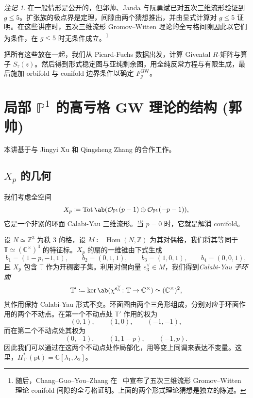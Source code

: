 \documentclass{amsart}
\theoremstyle{definition}
\theoremstyle{remark}
\newtheorem{rmk}[thm]{注记}
\theoremstyle{plain}
\theoremstyle{definition}
\theoremstyle{remark}
\newcommand{\C}{\mathbb{C}}
\newcommand{\Z}{\mathbb{Z}}
\renewcommand{\P}{\mathbb{P}}
\newcommand{\mc}[1]{\mathcal{#1}}
\newcommand{\T}{\mathbb{T}}
\newcommand{\mr}[1]{\mathrm{#1}}
\newcommand{\on}[1]{\operatorname{#1}}
\newcommand{\1}{\mathbf{1}}
\newcommand{\2}{\mathbf{2}}
\newcommand{\3}{\mathbf{3}}
\DeclareMathOperator{\Hom}{Hom}
\begin{document}
\begin{rmk}
     在一般情形是公开的，但郭帅、Janda 与阮勇斌已对五次三维流形验证到 \(g \leq 5\)。扩张族的极点界是定理，间隙由两个猜想推出，并由显式计算对 \(g \leq 5\) 证明。在这些讲座时，五次三维流形 Gromov--Witten 理论的全亏格间隙因此以它们为条件，在 \(g \leq 5\) 时无条件成立。\footnote{随后，Chang--Guo--You--Zhang 在~\cite{CGYZ2026} 中宣布了五次三维流形 Gromov--Witten 理论 conifold 间隙的全亏格证明。上面的两个形式理论猜想是独立的陈述。}
\end{rmk}

把所有这些放在一起，我们从 Picard-Fuchs 数据出发，计算 Givental \(R\)-矩阵与算子 \(S_{\tau}(z)\)。然后得到形式稳定图与亚纯剩余图，用全纯反常方程与有限生成，最后施加 orbifold 与 conifold 边界条件以确定 \(F_g^{\mr{GW}}\)。
\section{\texorpdfstring{局部 \(\P^1\) 的高亏格 GW 理论的结构}{局部 P1 的高亏格 GW 理论的结构} (郭帅)}%
\label{sec:Structure of higher-genus GW theory of local P1 (Shuai Guo)}

本讲基于与 Jingyi Xu 和 Qingsheng Zhang 的合作工作。

\subsection{\(X_p\) 的几何}%
\label{sub:The geometry of Xp}

我们考虑全空间
\[ X_p \coloneqq \on{Tot}\ab(\mc{O}_{\P^1}(p-1) \oplus \mc{O}_{\P^1}(-p-1)), \]
它是一个非紧的环面 Calabi-Yau 三维流形。当 \(p = 0\) 时，它就是解消 conifold。

设 \(N \simeq \Z^3\) 为秩 \(3\) 的格，设 \(M \coloneqq \Hom(N,\Z)\) 为其对偶格，我们将其等同于 \(\T \simeq (\C^{\times})^3\) 的特征标。\(X_p\) 的扇的一维锥由下式生成
\[ b_1 = (1-p,-1,1), \qquad b_2 = (0,1,1), \qquad b_3 = (1,0,1), \qquad b_4 = (0,0,1), \]
且 \(X_p\) 包含 \(\T\) 作为开稠密子集。利用对偶向量 \(e_3^{\vee} \in M\)，我们得到\textit{Calabi-Yau 子环面}
\[ \T' \coloneqq \ker\ab(\chi^{e_3^{\vee}} \colon \T \to \C^{\times}) \simeq (\C^{\times})^2, \]
其作用保持 Calabi-Yau 形式不变。环面图由两个三角形组成，分别对应于环面作用的两个不动点。在第一个不动点处 \(\T'\) 作用的权为
\[ (0,1), \qquad (1,0), \qquad (-1,-1), \]
而在第二个不动点处其权为
\[ (0,-1), \qquad (1,1-p), \qquad (-1,p). \]
因此我们可以通过在这两个不动点处作局部化，用等变上同调来表达不变量。这里，\(H^*_{\T'}(\mr{pt}) = \C[\lambda_1,\lambda_2]\)。
\end{document}
